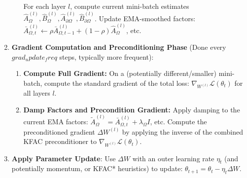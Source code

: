 \documentclass[12pt,a4paper]{article}
\begin{document}
\begin{enumerate}[leftmargin=*,nosep]
\begin{enumerate}
            For each layer \(l\), compute current mini-batch estimates \(\hat{A}_\Omega^{(l)}, \hat{B}_\Omega^{(l)}, \hat{A}_{\partial\Omega}^{(l)}, \hat{B}_{\partial\Omega}^{(l)}\). Update EMA-smoothed factors: \( \bar{A}_{\Omega,t}^{(l)} \leftarrow \rho \bar{A}_{\Omega,t-1}^{(l)} + (1-\rho)\hat{A}_\Omega^{(l)} \), etc.
    \end{enumerate}
\item \textbf{Gradient Computation and Preconditioning Phase} (Done every $grad_update_freq$ steps, typically more frequent):
    \begin{enumerate}
        \item \textbf{Compute Full Gradient:} On a (potentially different/smaller) mini-batch, compute the standard gradient of the total loss: \(\nabla_{W^{(l)}} \mathcal{L}(\theta_t)\) for all layers \(l\).
        \item \textbf{Damp Factors and Precondition Gradient:} Apply damping to the current EMA factors: \(\tilde{A}_{\Omega}^{(l)} = \bar{A}_{\Omega,t}^{(l)} + \lambda_\Omega I\), etc. Compute the preconditioned gradient \(\Delta W^{(l)}\) by applying the inverse of the combined KFAC preconditioner to \(\nabla_{W^{(l)}} \mathcal{L}(\theta_t)\).
    \end{enumerate}
\item \textbf{Apply Parameter Update}:
    Use \(\Delta W\) with an outer learning rate \(\eta_t\) (and potentially momentum, or KFAC* heuristics) to update: \(\theta_{t+1} = \theta_t - \eta_t \Delta W\).
\end{enumerate}
\end{document}
